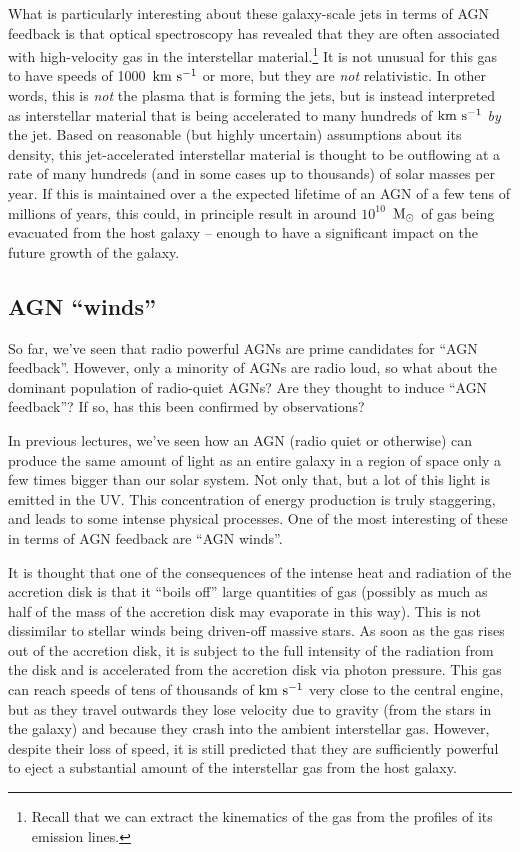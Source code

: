 \documentclass[11pt]{article}
\begin{document}
What is particularly interesting about these galaxy-scale jets in
terms of AGN feedback is that optical spectroscopy has revealed that
they are often associated with high-velocity gas in the interstellar
material.\footnote{Recall that we can extract the kinematics of the
  gas from the profiles of its emission lines.} It is not unusual for
this gas to have speeds of 1000~${\rm km~s^{-1}}$ or more, but they
are {\it not} relativistic. In other words, this is {\it not} the
plasma that is forming the jets, but is instead interpreted as
interstellar material that is being accelerated to many hundreds of
${\rm km~s^{-1}}$ {\it by} the jet. Based on reasonable (but highly
uncertain) assumptions about its density, this jet-accelerated
interstellar material is thought to be outflowing at a rate of many
hundreds (and in some cases up to thousands) of solar masses per
year. If this is maintained over a the expected lifetime of an AGN of
a few tens of millions of years, this could, in principle result in
around $10^{10}$~${\rm M_\odot}$ of gas being evacuated from the host
galaxy -- enough to have a significant impact on the future growth of
the galaxy.

\subsection{AGN ``winds''}
So far, we've seen that radio powerful AGNs are prime candidates for
``AGN feedback''. However, only a minority of AGNs are radio loud, so
what about the dominant population of radio-quiet AGNs? Are they
thought to induce ``AGN feedback''? If so, has this been confirmed by
observations?

In previous lectures, we've seen how an AGN (radio quiet or otherwise)
can produce the same amount of light as an entire galaxy in a region
of space only a few times bigger than our solar system. Not only that,
but a lot of this light is emitted in the UV. This concentration of
energy production is truly staggering, and leads to some intense
physical processes. One of the most interesting of these in terms of
AGN feedback are ``AGN winds''.

It is thought that one of the consequences of the intense heat and
radiation of the accretion disk is that it ``boils off'' large
quantities of gas (possibly as much as half of the mass of the
accretion disk may evaporate in this way). This is not dissimilar
to stellar winds being driven-off massive stars. As soon as the gas rises
out of the accretion disk, it is subject to the full intensity of the
radiation from the disk and is accelerated from the accretion disk via
photon pressure. This gas can reach speeds of tens of thousands of
${\rm km~s^{-1}}$ very close to the central engine, but as they travel
outwards they lose velocity due to gravity (from the stars in the
galaxy) and because they crash into the ambient interstellar
gas. However, despite their loss of speed, it is still predicted that
they are sufficiently powerful to eject a substantial amount of the
interstellar gas from the host galaxy.
\end{document}
